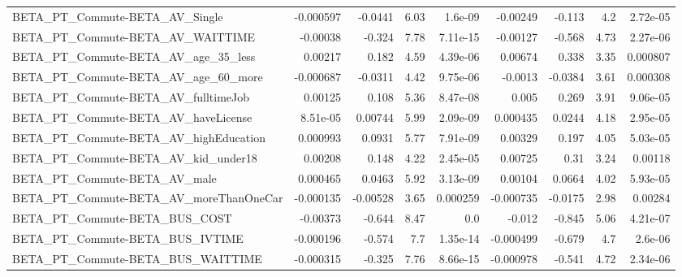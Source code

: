 \begin{tabular}{lrrrrrrrr}
BETA\_PT\_Commute-BETA\_AV\_Single                     &   -0.000597 &      -0.0441 &     6.03 &  1.6e-09 &   -0.00249 &      -0.113 &          4.2 &      2.72e-05 \\
BETA\_PT\_Commute-BETA\_AV\_WAITTIME                   &    -0.00038 &       -0.324 &     7.78 & 7.11e-15 &   -0.00127 &      -0.568 &         4.73 &      2.27e-06 \\
BETA\_PT\_Commute-BETA\_AV\_age\_35\_less                &     0.00217 &        0.182 &     4.59 & 4.39e-06 &    0.00674 &       0.338 &         3.35 &      0.000807 \\
BETA\_PT\_Commute-BETA\_AV\_age\_60\_more                &   -0.000687 &      -0.0311 &     4.42 & 9.75e-06 &    -0.0013 &     -0.0384 &         3.61 &      0.000308 \\
BETA\_PT\_Commute-BETA\_AV\_fulltimeJob                &     0.00125 &        0.108 &     5.36 & 8.47e-08 &      0.005 &       0.269 &         3.91 &      9.06e-05 \\
BETA\_PT\_Commute-BETA\_AV\_haveLicense                &    8.51e-05 &      0.00744 &     5.99 & 2.09e-09 &   0.000435 &      0.0244 &         4.18 &      2.95e-05 \\
BETA\_PT\_Commute-BETA\_AV\_highEducation              &    0.000993 &       0.0931 &     5.77 & 7.91e-09 &    0.00329 &       0.197 &         4.05 &      5.03e-05 \\
BETA\_PT\_Commute-BETA\_AV\_kid\_under18                &     0.00208 &        0.148 &     4.22 & 2.45e-05 &    0.00725 &        0.31 &         3.24 &       0.00118 \\
BETA\_PT\_Commute-BETA\_AV\_male                       &    0.000465 &       0.0463 &     5.92 & 3.13e-09 &    0.00104 &      0.0664 &         4.02 &      5.93e-05 \\
BETA\_PT\_Commute-BETA\_AV\_moreThanOneCar             &   -0.000135 &     -0.00528 &     3.65 & 0.000259 &  -0.000735 &     -0.0175 &         2.98 &       0.00284 \\
BETA\_PT\_Commute-BETA\_BUS\_COST                      &    -0.00373 &       -0.644 &     8.47 &      0.0 &     -0.012 &      -0.845 &         5.06 &      4.21e-07 \\
BETA\_PT\_Commute-BETA\_BUS\_IVTIME                    &   -0.000196 &       -0.574 &      7.7 & 1.35e-14 &  -0.000499 &      -0.679 &          4.7 &       2.6e-06 \\
BETA\_PT\_Commute-BETA\_BUS\_WAITTIME                  &   -0.000315 &       -0.325 &     7.76 & 8.66e-15 &  -0.000978 &      -0.541 &         4.72 &      2.34e-06 \\

\end{tabular}
